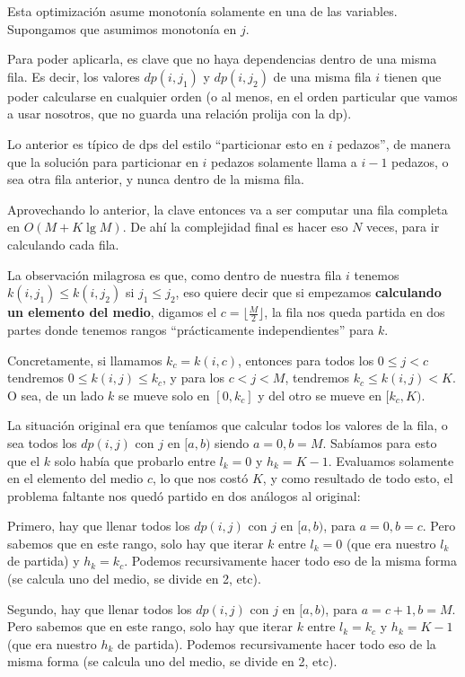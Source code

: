 \documentclass{article}
\def\lg{\mathop{\mathrm {lg}}\nolimits}
\begin{document}
Esta optimización asume monotonía solamente en una de las variables. Supongamos que asumimos monotonía en $j$.

Para poder aplicarla, es clave que no haya
dependencias dentro de una misma fila. Es decir, los valores $dp(i,j_1)$ y $dp(i,j_2)$ de una misma fila $i$ tienen que poder calcularse en cualquier orden
(o al menos, en el orden particular que vamos a usar nosotros, que no guarda una relación prolija con la dp).

Lo anterior es típico de dps del estilo ``particionar esto en $i$ pedazos'', de manera que la solución para particionar en $i$ pedazos solamente llama a $i-1$ pedazos,
o sea otra fila anterior, y nunca dentro de la misma fila.

Aprovechando lo anterior, la clave entonces va a ser computar una fila completa en $O(M + K \lg M)$. De ahí la complejidad final es hacer eso $N$ veces,
para ir calculando cada fila.

La observación milagrosa es que, como dentro de nuestra fila $i$ tenemos $k(i,j_1) \leq k(i,j_2)$ si $j_1 \leq j_2$, eso quiere decir que si empezamos
\textbf{calculando un elemento del medio}, digamos el $c=\lfloor \frac{M}{2} \rfloor$, la fila nos queda partida en dos partes donde tenemos rangos
``prácticamente independientes'' para $k$. 

Concretamente, si llamamos $k_c = k(i,c)$, entonces para todos los $0 \leq j < c$ tendremos $0 \leq k(i,j) \leq k_c$, y para los $c < j < M$, tendremos $k_c \leq k(i,j) < K$.
O sea, de un lado $k$ se mueve solo en $[0,k_c]$ y del otro se mueve en $[k_c, K)$. 

La situación original era que teníamos que calcular todos los valores de la fila, o sea todos los $dp(i,j)$ con $j$ en $[a,b)$ siendo $a=0, b=M$. Sabíamos
para esto que el $k$ solo había que probarlo entre $l_k = 0$ y $h_k = K-1$. Evaluamos solamente en el elemento del medio $c$, lo que nos costó $K$,
y como resultado de todo esto, el problema faltante nos quedó partido en dos análogos al original:

Primero, hay que llenar todos los $dp(i,j)$ con $j$ en $[a,b)$, para $a=0, b=c$. Pero sabemos que en este rango, solo hay que iterar $k$ entre $l_k = 0$
(que era nuestro $l_k$ de partida) y $h_k = k_c$. Podemos recursivamente hacer todo eso de la misma forma (se calcula uno del medio, se divide en 2, etc).

Segundo, hay que llenar todos los $dp(i,j)$ con $j$ en $[a,b)$, para $a=c+1, b=M$. Pero sabemos que en este rango, solo hay que iterar $k$ entre $l_k = k_c$
y $h_k = K-1$ (que era nuestro $h_k$ de partida). Podemos recursivamente hacer todo eso de la misma forma (se calcula uno del medio, se divide en 2, etc).
\end{document}
